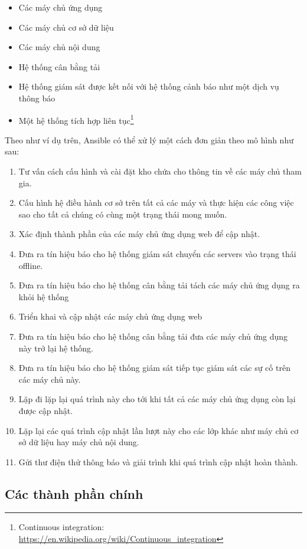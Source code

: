 \begin{itemize}
\item Các máy chủ ứng dụng
\item Các máy chủ cơ sở dữ liệu
\item Các máy chủ nội dung
\item Hệ thống cân bằng tải
\item Hệ thống giám sát được kết nối với hệ thống cảnh báo như một dịch vụ thông báo
\item Một hệ thống tích hợp liên tục\footnote{Continuous integration: \url{https://en.wikipedia.org/wiki/Continuous_integration}}
\end{itemize}

Theo như ví dụ trên, Ansible có thể xử lý một cách đơn giản theo mô hình như sau:

\begin{enumerate}
\item Tư vấn cách cấu hình và cài đặt kho chứa cho thông tin về các máy chủ tham gia.
\item Cấu hình hệ điều hành cơ sở trên tất cả các máy và thực hiện các công việc sao cho tất cả chúng có cùng một trạng thái mong muốn.
\item Xác định thành phần của các máy chủ ứng dụng web để cập nhật.
\item Đưa ra tín hiệu báo cho hệ thống giám sát chuyển các servers vào trạng thái offline.
\item Đưa ra tín hiệu báo cho hệ thống cân bằng tải tách các máy chủ ứng dụng ra khỏi hệ thống
\item Triển khai và cập nhật các máy chủ ứng dụng web
\item Đưa ra tín hiệu báo cho hệ thống cân bằng tải đưa các máy chủ ứng dụng này trở lại hệ thống.
\item Đưa ra tín hiệu báo cho hệ thống giám sát tiếp tục giám sát các sự cố trên các máy chủ này.
\item Lặp đi lặp lại quá trình này cho tới khi tất cả các máy chủ ứng dụng còn lại được cập nhật.
\item Lặp lại các quá trình cập nhật lần lượt này cho các lớp khác như máy chủ cơ sở dữ liệu hay máy chủ nội dung.
\item Gửi thư điện thử thông báo và giải trình khi quá trình cập nhật hoàn thành.
\end{enumerate}

\subsection{Các thành phần chính}

